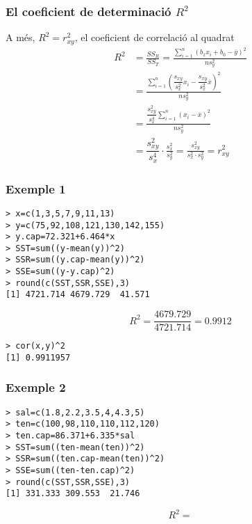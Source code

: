 \documentclass[12pt,t]{beamer}
\renewcommand{\emph}[1]{{\color{red}#1}}
\theoremstyle{plain}
\theoremstyle{definition}
\begin{document}
\begin{frame}
\frametitle{El coeficient de determinació $R^2$}
A més, \emph{$R^2=r_{xy}^2$}, el coeficient de correlació al quadrat
$$
\begin{array}{rl}
R^2 & \displaystyle =\frac{SS_R}{SS_T}=\frac{\sum\limits_{i=1}^n(b_1x_i+b_0-\overline{y})^2}{ns_y^2}\\[2ex] 
& \displaystyle =\frac{\sum\limits_{i=1}^n(\dfrac{s_{xy}}{s_x^2}x_i-\dfrac{s_{xy}}{s_x^2}\overline{x})^2}{ns_y^2}\\[2ex] 
& \displaystyle =\frac{\dfrac{s_{xy}^2}{s_x^4}\sum\limits_{i=1}^n(x_i-\overline{x})^2}{ns_y^2}\\[2ex] & \displaystyle =\dfrac{s_{xy}^2}{s_x^4}\cdot \frac{s_x^2}{s_y^2}=\frac{s_{xy}^2}{s_x^2\cdot s_y^2}=r_{xy}^2
\end{array}
$$
\end{frame}

%
%

\begin{frame}[fragile]
\frametitle{Exemple 1}
\vspace*{-2ex}

\begin{verbatim}
> x=c(1,3,5,7,9,11,13)
> y=c(75,92,108,121,130,142,155)
> y.cap=72.321+6.464*x
> SST=sum((y-mean(y))^2)
> SSR=sum((y.cap-mean(y))^2)
> SSE=sum((y-y.cap)^2)
> round(c(SST,SSR,SSE),3)
[1] 4721.714 4679.729  41.571
\end{verbatim}
$$
R^2=\frac{4679.729}{4721.714}=0.9912
$$
\begin{verbatim}
> cor(x,y)^2
[1] 0.9911957
\end{verbatim}
\end{frame}

\begin{frame}[fragile]
\frametitle{Exemple 2}
\vspace*{-3ex}

\small \begin{verbatim}
> sal=c(1.8,2.2,3.5,4,4.3,5)
> ten=c(100,98,110,110,112,120)
> ten.cap=86.371+6.335*sal
> SST=sum((ten-mean(ten))^2)
> SSR=sum((ten.cap-mean(ten))^2)
> SSE=sum((ten-ten.cap)^2)
> round(c(SST,SSR,SSE),3)
[1] 331.333 309.553  21.746
\end{verbatim}
$$
R^2= 
$$
\end{frame}
\end{document}
